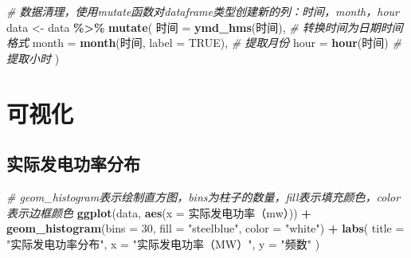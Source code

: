 \documentclass[
]{ctexart}
\newenvironment{Shaded}{\begin{snugshade}}{\end{snugshade}}
\newcommand{\AttributeTok}[1]{\textcolor[rgb]{0.13,0.29,0.53}{#1}}
\newcommand{\CommentTok}[1]{\textcolor[rgb]{0.56,0.35,0.01}{\textit{#1}}}
\newcommand{\ConstantTok}[1]{\textcolor[rgb]{0.56,0.35,0.01}{#1}}
\newcommand{\DecValTok}[1]{\textcolor[rgb]{0.00,0.00,0.81}{#1}}
\newcommand{\FunctionTok}[1]{\textcolor[rgb]{0.13,0.29,0.53}{\textbf{#1}}}
\newcommand{\NormalTok}[1]{#1}
\newcommand{\OtherTok}[1]{\textcolor[rgb]{0.56,0.35,0.01}{#1}}
\newcommand{\SpecialCharTok}[1]{\textcolor[rgb]{0.81,0.36,0.00}{\textbf{#1}}}
\newcommand{\StringTok}[1]{\textcolor[rgb]{0.31,0.60,0.02}{#1}}
\begin{document}
\begin{Shaded}
\begin{Highlighting}[]
\CommentTok{\# 数据清理，使用mutate函数对dataframe类型创建新的列：时间，month，hour}
\NormalTok{data }\OtherTok{\textless{}{-}}\NormalTok{ data }\SpecialCharTok{\%\textgreater{}\%}
  \FunctionTok{mutate}\NormalTok{(}
\NormalTok{    时间 }\OtherTok{=} \FunctionTok{ymd\_hms}\NormalTok{(时间),         }\CommentTok{\# 转换时间为日期时间格式}
    \AttributeTok{month =} \FunctionTok{month}\NormalTok{(时间, }\AttributeTok{label =} \ConstantTok{TRUE}\NormalTok{), }\CommentTok{\# 提取月份}
    \AttributeTok{hour =} \FunctionTok{hour}\NormalTok{(时间)              }\CommentTok{\# 提取小时}
\NormalTok{  )}
\end{Highlighting}
\end{Shaded}

\section{可视化}\label{ux53efux89c6ux5316}

\subsection{实际发电功率分布}\label{ux5b9eux9645ux53d1ux7535ux529fux7387ux5206ux5e03}

\begin{Shaded}
\begin{Highlighting}[]
\CommentTok{\# geom\_histogram表示绘制直方图，bins为柱子的数量，fill表示填充颜色，color表示边框颜色}
\FunctionTok{ggplot}\NormalTok{(data, }\FunctionTok{aes}\NormalTok{(}\AttributeTok{x =} \StringTok{\textasciigrave{}}\AttributeTok{实际发电功率（mw）}\StringTok{\textasciigrave{}}\NormalTok{)) }\SpecialCharTok{+}
  \FunctionTok{geom\_histogram}\NormalTok{(}\AttributeTok{bins =} \DecValTok{30}\NormalTok{, }\AttributeTok{fill =} \StringTok{"steelblue"}\NormalTok{, }\AttributeTok{color =} \StringTok{"white"}\NormalTok{) }\SpecialCharTok{+}
  \FunctionTok{labs}\NormalTok{(}
    \AttributeTok{title =} \StringTok{"实际发电功率分布"}\NormalTok{,}
    \AttributeTok{x =} \StringTok{"实际发电功率（MW）"}\NormalTok{,}
    \AttributeTok{y =} \StringTok{"频数"}
\NormalTok{  )}
\end{Highlighting}
\end{Shaded}
\end{document}
